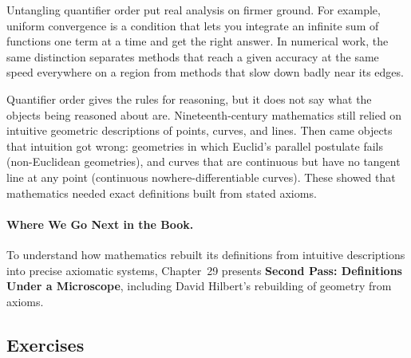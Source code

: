 Untangling quantifier order put real analysis on firmer ground. For example, uniform convergence is a condition that lets you integrate an infinite sum of functions one term at a time and get the right answer. In numerical work, the same distinction separates methods that reach a given accuracy at the same speed everywhere on a region from methods that slow down badly near its edges.

Quantifier order gives the rules for reasoning, but it does not say what the objects being reasoned about are. Nineteenth-century mathematics still relied on intuitive geometric descriptions of points, curves, and lines. Then came objects that intuition got wrong: geometries in which Euclid's parallel postulate fails (non-Euclidean geometries), and curves that are continuous but have no tangent line at any point (continuous nowhere-differentiable curves). These showed that mathematics needed exact definitions built from stated axioms.

\paragraph{Where We Go Next in the Book.}
To understand how mathematics rebuilt its definitions from intuitive descriptions into precise axiomatic systems, Chapter~29 presents \textbf{Second Pass: Definitions Under a Microscope}, including David Hilbert's rebuilding of geometry from axioms.

\subsection{Exercises}

